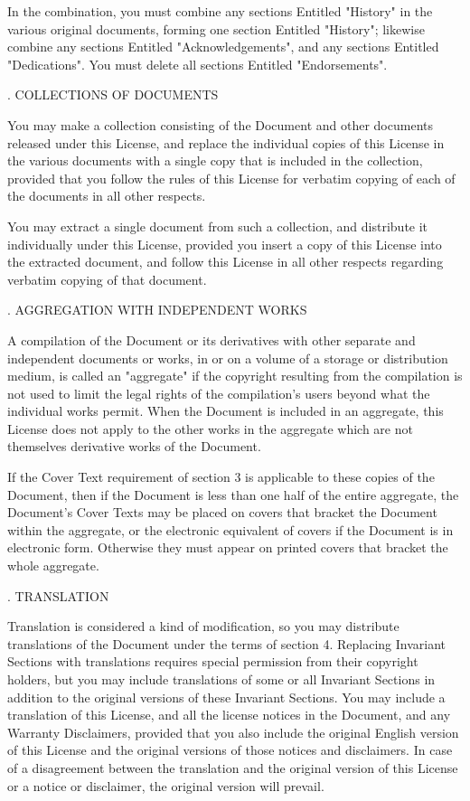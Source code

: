 In the combination, you must combine any sections Entitled "History" in the various original documents, forming one section Entitled "History"; likewise combine any sections Entitled "Acknowledgements", and any sections Entitled "Dedications". You must delete all sections Entitled "Endorsements".

. COLLECTIONS OF DOCUMENTS

You may make a collection consisting of the Document and other documents released under this License, and replace the individual copies of this License in the various documents with a single copy that is included in the collection, provided that you follow the rules of this License for verbatim copying of each of the documents in all other respects.

You may extract a single document from such a collection, and distribute it individually under this License, provided you insert a copy of this License into the extracted document, and follow this License in all other respects regarding verbatim copying of that document.

. AGGREGATION WITH INDEPENDENT WORKS

A compilation of the Document or its derivatives with other separate and independent documents or works, in or on a volume of a storage or distribution medium, is called an "aggregate" if the copyright resulting from the compilation is not used to limit the legal rights of the compilation's users beyond what the individual works permit. When the Document is included in an aggregate, this License does not apply to the other works in the aggregate which are not themselves derivative works of the Document.

If the Cover Text requirement of section 3 is applicable to these copies of the Document, then if the Document is less than one half of the entire aggregate, the Document's Cover Texts may be placed on covers that bracket the Document within the aggregate, or the electronic equivalent of covers if the Document is in electronic form. Otherwise they must appear on printed covers that bracket the whole aggregate.

. TRANSLATION

Translation is considered a kind of modification, so you may distribute translations of the Document under the terms of section 4. Replacing Invariant Sections with translations requires special permission from their copyright holders, but you may include translations of some or all Invariant Sections in addition to the original versions of these Invariant Sections. You may include a translation of this License, and all the license notices in the Document, and any Warranty Disclaimers, provided that you also include the original English version of this License and the original versions of those notices and disclaimers. In case of a disagreement between the translation and the original version of this License or a notice or disclaimer, the original version will prevail.


